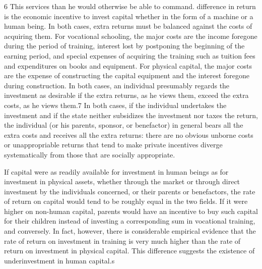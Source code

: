 \documentclass[11pt,openany]{book}
\begin{document}
6 This services than he would otherwise be able to command. difference in return is the economic incentive to invest capital whether in the form of a machine or a human being. In both cases, extra returns must be balanced against the costs of acquiring them. For vocational schooling, the major costs are the income foregone during the period of training, interest lost by postponing the beginning of the earning period, and special expenses of acquiring the training such as tuition fees and expenditures on books and equipment. For physical capital, the major costs are the expense of constructing the capital equipment and the interest foregone during construction. In both cases, an individual presumably regards the investment as desirable if the extra returns, as he views them, exceed the extra costs, as he views them.7 In both cases, if the individual undertakes the investment and if the state neither subsidizes the investment nor taxes the return, the individual (or his parents, sponsor, or benefactor) in general bears all the extra costs and receives all the extra returns: there are no obvious unborne costs or unappropriable returns that tend to make private incentives diverge systematically from those that are socially appropriate.

If capital were as readily available for investment in human beings as for investment in physical assets, whether through the market or through direct investment by the individuals concerned, or their parents or benefactors, the rate of return on capital would tend to be roughly equal in the two fields. If it were higher on non-human capital, parents would have an incentive to buy such capital for their children instead of investing a corresponding sum in vocational training, and conversely. In fact, however, there is considerable empirical evidence that the rate of return on investment in training is very much higher than the rate of return on investment in physical capital. This difference suggests the existence of underinvestment in human capital.s
\end{document}
